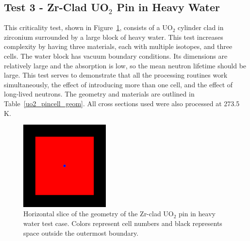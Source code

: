 \documentclass[preprint,12pt]{elsarticle}
\begin{document}
\newpage
\subsection{Test 3 - Zr-Clad UO$_2$ Pin in Heavy Water}

This criticality test, shown in Figure~\ref{pincell_geom_pic}, consists of a UO$_2$ cylinder clad in zirconium surrounded by a large block of heavy water.  This test increases complexity by having three materials, each with multiple isotopes, and three cells.  The water block has vacuum boundary conditions.  Its dimensions are relatively large and the absorption is low, so the mean neutron lifetime should be large.  This test serves to demonstrate that all the processing routines work simultaneously,
 the effect of introducing more than one cell, and the effect of long-lived neutrons.  The geometry and materials are outlined in Table~\ref{uo2_pincell_geom}.  All cross sections used were also processed at 273.5 K.

\begin{figure}[h!] 
  \centering
    \includegraphics[width=0.4\textwidth]{graphics/pincell-xy.png}
     \caption{  Horizontal slice of the geometry of the Zr-clad UO$_2$ pin in heavy water test case.  Colors represent cell numbers and black represents space outside the outermost boundary. \label{pincell_geom_pic} }
\end{figure}
\end{document}

